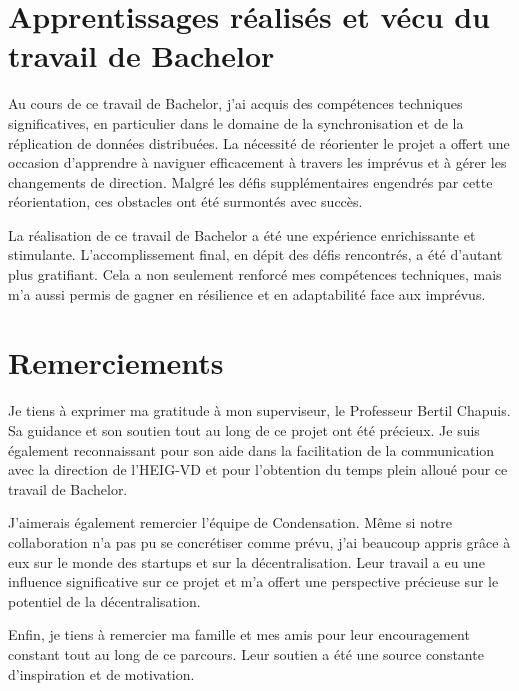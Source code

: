 \section{Apprentissages réalisés et vécu du travail de Bachelor}

Au cours de ce travail de Bachelor, j'ai acquis des compétences techniques significatives, en particulier dans le domaine de la synchronisation et de la réplication de données distribuées. La nécessité de réorienter le projet a offert une occasion d'apprendre à naviguer efficacement à travers les imprévus et à gérer les changements de direction. Malgré les défis supplémentaires engendrés par cette réorientation, ces obstacles ont été surmontés avec succès.

La réalisation de ce travail de Bachelor a été une expérience enrichissante et stimulante. L'accomplissement final, en dépit des défis rencontrés, a été d'autant plus gratifiant. Cela a non seulement renforcé mes compétences techniques, mais m'a aussi permis de gagner en résilience et en adaptabilité face aux imprévus.

\section{Remerciements}

Je tiens à exprimer ma gratitude à mon superviseur, le Professeur Bertil Chapuis. Sa guidance et son soutien tout au long de ce projet ont été précieux. Je suis également reconnaissant pour son aide dans la facilitation de la communication avec la direction de l'HEIG-VD et pour l'obtention du temps plein alloué pour ce travail de Bachelor.

J'aimerais également remercier l'équipe de Condensation. Même si notre collaboration n'a pas pu se concrétiser comme prévu, j'ai beaucoup appris grâce à eux sur le monde des startups et sur la décentralisation. Leur travail a eu une influence significative sur ce projet et m'a offert une perspective précieuse sur le potentiel de la décentralisation.

Enfin, je tiens à remercier ma famille et mes amis pour leur encouragement constant tout au long de ce parcours. Leur soutien a été une source constante d'inspiration et de motivation.

\hspace{8cm}\makeatletter\@author\makeatother\par
\hspace{8cm}\begin{minipage}{5cm}
\end{minipage}
\printsignature